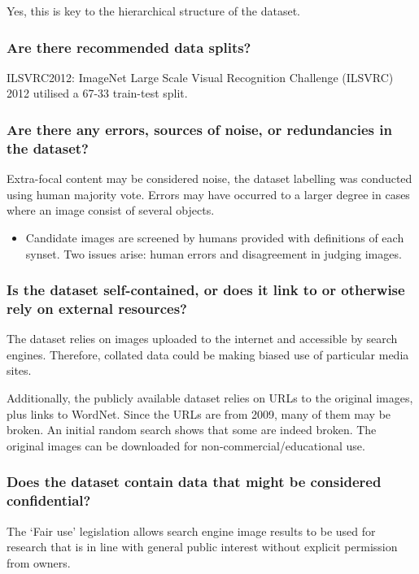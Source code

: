 \documentclass[a4paper,12pt]{article}
\begin{document}
Yes, this is key to the hierarchical structure of the dataset.

\subsubsection*{Are there recommended data splits?}

ILSVRC2012: ImageNet Large Scale Visual Recognition Challenge (ILSVRC) 2012 utilised a 67-33%
train-test split.

\subsubsection*{Are there any errors, sources of noise, or redundancies in the dataset?}

Extra-focal content may be considered noise, the dataset labelling was conducted using human
majority vote. Errors may have occurred to a larger degree in cases where an image consist of
several objects.
\begin{itemize}
\item Candidate images are screened by humans provided with definitions of each synset. Two
issues arise: human errors and disagreement in judging images.
\end{itemize}

\subsubsection*{Is the dataset self-contained, or does it link to or otherwise rely on external resources?}

The dataset relies on images uploaded to the internet and accessible by search engines. Therefore,
collated data could be making biased use of particular media sites.

Additionally, the publicly available dataset relies on URLs to the original images, plus
links to WordNet. Since the URLs are from 2009, many of them may be broken. An
initial random search shows that some are indeed broken. The original images can be
downloaded for non-commercial/educational use.

\subsubsection*{Does the dataset contain data that might be considered confidential?}

The `Fair use' legislation allows search engine image results to be used for research that is in line
with general public interest without explicit permission from owners.
\end{document}
